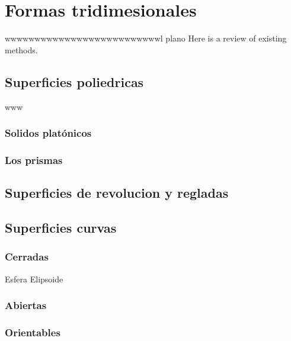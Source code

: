 \documentclass[
  16pt,
]{krantz}
\theoremstyle{definition}
\theoremstyle{definition}
\theoremstyle{definition}
\theoremstyle{definition}
\theoremstyle{remark}
\begin{document}
\hypertarget{formas-tridimesionales}{%
\chapter{Formas tridimesionales}\label{formas-tridimesionales}}

wwwwwwwwwwwwwwwwwwwwwwwwwwl plano Here is a review of existing methods.

\hypertarget{superficies-poliedricas}{%
\section{Superficies poliedricas}\label{superficies-poliedricas}}

www

\hypertarget{solidos-platuxf3nicos}{%
\subsection{Solidos platónicos}\label{solidos-platuxf3nicos}}

\hypertarget{los-prismas}{%
\subsection{Los prismas}\label{los-prismas}}

\hypertarget{superficies-de-revolucion-y-regladas}{%
\section{Superficies de revolucion y regladas}\label{superficies-de-revolucion-y-regladas}}

\hypertarget{superficies-curvas}{%
\section{Superficies curvas}\label{superficies-curvas}}

\hypertarget{cerradas}{%
\subsection{Cerradas}\label{cerradas}}

Esfera Elipsoide

\hypertarget{abiertas}{%
\subsection{Abiertas}\label{abiertas}}

\hypertarget{orientables}{%
\subsection{Orientables}\label{orientables}}
\end{document}
